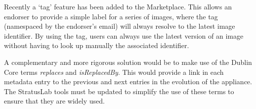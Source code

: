 Recently a `tag' feature has been added to the Marketplace\@.  This
allows an endorser to provide a simple label for a series of images,
where the tag (namespaced by the endorser's email) will always resolve
to the latest image identifier.  By using the tag, users can always
use the latest version of an image without having to look up manually
the associated identifier. 

A complementary and more rigorous solution would be to make use of the
Dublin Core terms \emph{replaces} and \emph{isReplacedBy}. This would
provide a link in each metadata entry to the previous and next entries
in the evolution of the appliance.  The StratusLab tools must be
updated to simplify the use of these terms to ensure that they are
widely used.
